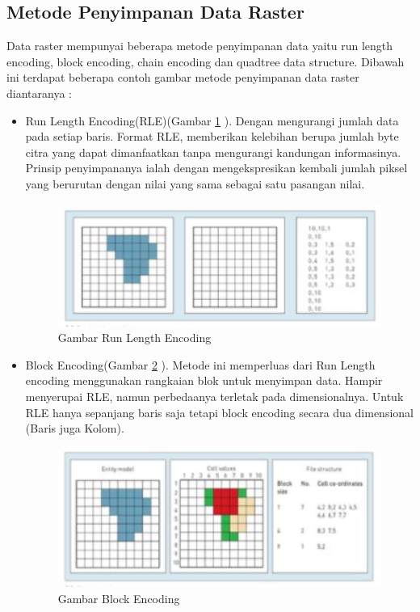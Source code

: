 \subsection{Metode Penyimpanan Data Raster}
Data raster mempunyai beberapa metode penyimpanan data yaitu run length encoding, block encoding, chain encoding dan quadtree data structure. Dibawah ini terdapat beberapa contoh gambar metode penyimpanan data raster diantaranya :
	\begin{itemize}
		\item  Run Length Encoding(RLE)(Gambar \ref{runlengthencoding} ). Dengan mengurangi jumlah data pada setiap baris. Format RLE, memberikan kelebihan berupa jumlah byte citra yang dapat dimanfaatkan tanpa mengurangi kandungan informasinya. Prinsip penyimpananya ialah dengan mengekspresikan kembali jumlah piksel yang berurutan dengan nilai yang sama sebagai satu pasangan nilai.
				\begin{figure} [ht]
					\centerline{\includegraphics[width=1\textwidth]{figures/runlengthencoding.JPG}}
					\caption{Gambar Run Length Encoding}
					\label{runlengthencoding}
				\end{figure}

		\item  Block Encoding(Gambar \ref{blockencoding} ). Metode ini memperluas dari Run Length encoding menggunakan rangkaian blok untuk menyimpan data. Hampir menyerupai RLE, namun perbedaanya terletak pada dimensionalnya. Untuk RLE hanya sepanjang baris saja tetapi block encoding secara dua dimensional (Baris juga Kolom).
				\begin{figure} [ht]
					\centerline{\includegraphics[width=1\textwidth]{figures/blockencoding.JPG}}
					\caption{Gambar Block Encoding}
					\label{blockencoding}
					

\end{figure}
\end{itemize}
